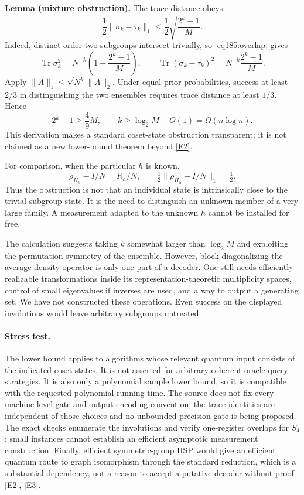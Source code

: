 \documentclass[11pt,a4paper]{article}
\newcommand{\eref}[2]{\hyperlink{extra:#1:#2}{[E#2]}}
\numberwithin{equation}{section}
\begin{document}
\textbf{Lemma (mixture obstruction).} The trace distance obeys
\begin{equation}\label{eq185:distance}
 \frac12\|\sigma_k-\tau_k\|_1
 \le\frac12\sqrt{\frac{2^k-1}{M}}.
\end{equation}
Indeed, distinct order-two subgroups intersect trivially, so \eqref{eq185:overlap} gives
\[
 \operatorname{Tr}\sigma_k^2=N^{-k}\left(1+\frac{2^k-1}{M}\right),
 \qquad
 \operatorname{Tr}(\sigma_k-\tau_k)^2=N^{-k}\frac{2^k-1}{M}.
\]
Apply $\|A\|_1\le\sqrt{N^k}\|A\|_2$. Under equal prior probabilities, success at least $2/3$ in distinguishing the two ensembles requires trace distance at least $1/3$. Hence
\[
 2^k-1\ge\frac49M,\qquad
 k\ge\log_2M-O(1)=\Omega(n\log n).
\]
This derivation makes a standard coset-state obstruction transparent; it is not claimed as a new lower-bound theorem beyond \eref{185}{2}.

For comparison, when the particular $h$ is known,
\[
 \rho_{H_h}-I/N=R_h/N,
 \qquad \tfrac12\|\rho_{H_h}-I/N\|_1=\tfrac12.
\]
Thus the obstruction is not that an individual state is intrinsically close to the trivial-subgroup state. It is the need to distinguish an unknown member of a very large family. A measurement adapted to the unknown $h$ cannot be installed for free.

The calculation suggests taking $k$ somewhat larger than $\log_2M$ and exploiting the permutation symmetry of the ensemble. However, block diagonalizing the average density operator is only one part of a decoder. One still needs efficiently realizable transformations inside its representation-theoretic multiplicity spaces, control of small eigenvalues if inverses are used, and a way to output a generating set. We have not constructed these operations. Even success on the displayed involutions would leave arbitrary subgroups untreated.

\paragraph{Stress test.}
The lower bound applies to algorithms whose relevant quantum input consists of the indicated coset states. It is not asserted for arbitrary coherent oracle-query strategies. It is also only a polynomial sample lower bound, so it is compatible with the requested polynomial running time. The source does not fix every machine-level gate and output-encoding convention; the trace identities are independent of those choices and no unbounded-precision gate is being proposed. The exact checks enumerate the involutions and verify one-register overlaps for $S_4$; small instances cannot establish an efficient asymptotic measurement construction. Finally, efficient symmetric-group HSP would give an efficient quantum route to graph isomorphism through the standard reduction, which is a substantial dependency, not a reason to accept a putative decoder without proof \eref{185}{2}, \eref{185}{3}.
\end{document}
